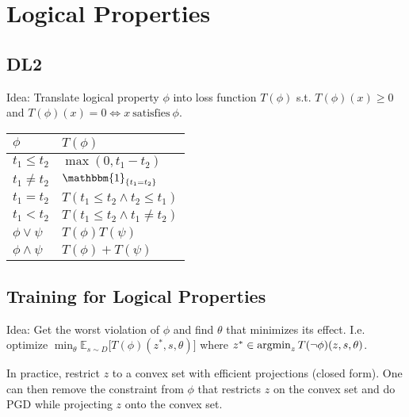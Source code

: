 \section{Logical Properties}
\subsection*{DL2}
Idea: Translate logical property $\phi$ into loss function $T(\phi)$
s.t. $T(\phi)(x) \geq 0$ and $T(\phi)(x) = 0 \Leftrightarrow x\ \text{satisfies}\ \phi$.

\vspace*{1mm}
\renewcommand{\arraystretch}{1.1}
\begin{tabular}{ll}
    \hline
    $\phi $           & $T(\phi)$                            \\
    \hline
    $t_1 \leq t_2$    & $\max(0, t_1 - t_2)$                 \\
    $t_1 \neq t_2$    & $\mathbbm{1}_{\{t_1 = t_2\}}$        \\
    $t_1 = t_2$       & $T(t_1 \leq t_2 \land t_2 \leq t_1)$ \\
    $t_1 < t_2$       & $T(t_1 \leq t_2 \land t_1 \neq t_2)$ \\
    $\phi \lor \psi$  & $T(\phi) T(\psi)$                    \\
    $\phi \land \psi$ & $T(\phi) + T(\psi)$                  \\
    \hline
\end{tabular}
\vspace*{1mm}

\subsection*{Training for Logical Properties}
Idea: Get the worst violation of $\phi$ and find $\theta$ that minimizes its effect. I.e. optimize {$\min_\theta\mathbb{E}_{s \sim D} \big[ T(\phi)(z^*, s, \theta) \big]$} where {$z^* \in \operatorname{\operatorname{argmin}}_z T(\lnot \phi)(z, s, \theta)$}.

In practice, restrict $z$ to a convex set with efficient projections (closed form). One can then remove the constraint from $\phi$ that restricts $z$ on the convex set and do PGD while projecting $z$ onto the convex set.